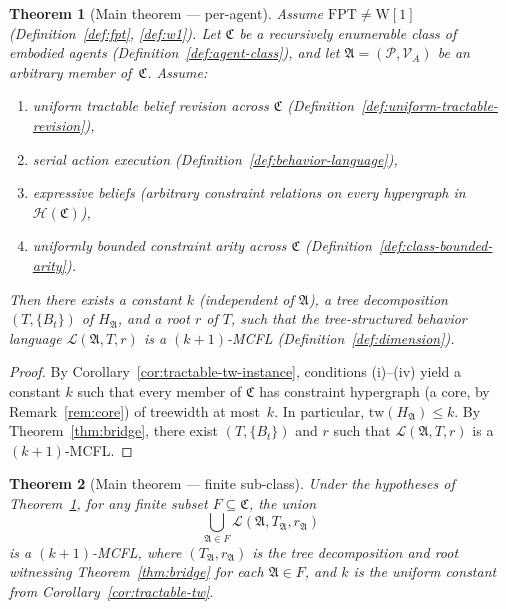 \documentclass[11pt,a4paper]{article}
\theoremstyle{plain}
\newtheorem{theorem}{Theorem}[section]
\theoremstyle{definition}
\theoremstyle{remark}
\begin{document}
\begin{theorem}[Main theorem --- per-agent]\label{thm:main}
Assume $\mathrm{FPT} \neq \mathrm{W}[1]$ (Definition~\ref{def:fpt}, \ref{def:w1}).
Let $\mathfrak{C}$ be a recursively enumerable class of embodied agents (Definition~\ref{def:agent-class}), and let $\mathfrak{A} = (\mathcal{P}, \mathcal{V}_A)$ be an arbitrary member of~$\mathfrak{C}$.
Assume:
\begin{enumerate}[nosep,label=(\roman*)]
  \item uniform tractable belief revision across $\mathfrak{C}$ (Definition~\ref{def:uniform-tractable-revision}),
  \item serial action execution (Definition~\ref{def:behavior-language}),
  \item expressive beliefs (arbitrary constraint relations on every hypergraph in $\mathcal{H}(\mathfrak{C})$),
  \item uniformly bounded constraint arity across $\mathfrak{C}$ (Definition~\ref{def:class-bounded-arity}).
\end{enumerate}
Then there exists a constant $k$ (independent of $\mathfrak{A}$), a tree decomposition $(T, \{B_t\})$ of $H_{\mathfrak{A}}$, and a root $r$ of $T$, such that the tree-structured behavior language $\mathcal{L}(\mathfrak{A}, T, r)$ is a $(k{+}1)$-MCFL (Definition~\ref{def:dimension}).
\end{theorem}

\begin{proof}
By Corollary~\ref{cor:tractable-tw-instance}, conditions (i)--(iv) yield a constant $k$ such that every member of $\mathfrak{C}$ has constraint hypergraph (a core, by Remark~\ref{rem:core}) of treewidth at most~$k$.
In particular, $\mathrm{tw}(H_{\mathfrak{A}}) \leq k$.
By Theorem~\ref{thm:bridge}, there exist $(T, \{B_t\})$ and $r$ such that $\mathcal{L}(\mathfrak{A}, T, r)$ is a $(k{+}1)$-MCFL.
\end{proof}

\begin{theorem}[Main theorem --- finite sub-class]\label{thm:main-finite}
Under the hypotheses of Theorem~\ref{thm:main}, for any finite subset $F \subseteq \mathfrak{C}$, the union
\[
  \bigcup_{\mathfrak{A} \in F} \mathcal{L}(\mathfrak{A}, T_{\mathfrak{A}}, r_{\mathfrak{A}})
\]
is a $(k{+}1)$-MCFL, where $(T_{\mathfrak{A}}, r_{\mathfrak{A}})$ is the tree decomposition and root witnessing Theorem~\ref{thm:bridge} for each $\mathfrak{A} \in F$, and $k$ is the uniform constant from Corollary~\ref{cor:tractable-tw}.
\end{theorem}
\end{document}

